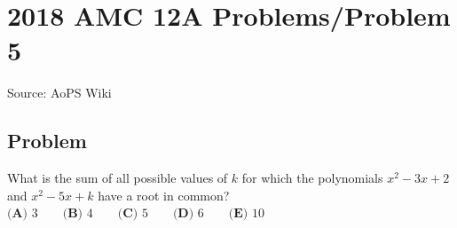 \documentclass[12pt]{article}
\begin{document}
\section*{{2018 AMC 12A Problems/Problem 5}}
Source: AoPS Wiki

\subsection*{Problem}
What is the sum of all possible values of $k$ for which the polynomials $x^2 - 3x + 2$ and $x^2 - 5x + k$ have a root in common? $\textbf{(A) }3 \qquad\textbf{(B) }4 \qquad\textbf{(C) }5 \qquad\textbf{(D) }6 \qquad\textbf{(E) }10$
\end{document}
